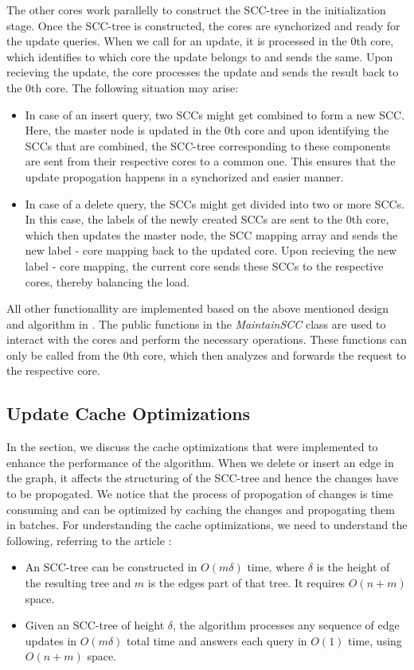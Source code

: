 The other cores work parallelly to construct the SCC-tree in the initialization stage. Once the SCC-tree is constructed, the cores are synchorized and ready for the update queries.
When we call for an update, it is processed in the 0th core, which identifies to which core the update belongs to and sends the same. Upon recieving the update, the core processes the update and sends the result back to the 0th core.
The following situation may arise:
\begin{itemize}
    \item In case of an insert query, two SCCs might get combined to form a new SCC. Here, the master node is updated in the 0th core and upon identifying the 
SCCs that are combined, the SCC-tree corresponding to these components are sent from their respective cores to a common one. This
ensures that the update propogation happens in a synchorized and easier manner.
    \item In case of a delete query, the SCCs might get divided into two or more SCCs. In this case, the labels of the newly created SCCs are sent to the 0th core, which then updates the master node, the SCC mapping array and sends the new label - core mapping back to the updated core.
Upon recieving the new label - core mapping, the current core sends these SCCs to the respective cores, thereby balancing the load.
\end{itemize}

All other functionallity are implemented based on the above mentioned design and algorithm in \secref{\ref{Sec: Theoretical Methodology}}. The public functions in the \textit{MaintainSCC} class are used to interact with the cores and perform the necessary operations.
These functions can only be called from the 0th core, which then analyzes and forwards the request to the respective core.

\subsection{Update Cache Optimizations}\label{Subsec: Cache Optimizations}

In the section, we discuss the cache optimizations that were implemented to enhance the performance of the algorithm.
When we delete or insert an edge in the graph, it affects the structuring of the SCC-tree and hence the changes have to be propogated.
We notice that the process of propogation of changes is time consuming and can be optimized by caching the changes and propogating them in batches.
For understanding the cache optimizations, we need to understand the following, referring to the article \cite{scc_tree_reference}:
\begin{itemize}
    \item An SCC-tree can be constructed in $O(m\delta)$ time, where $\delta$ is the height of
the resulting tree and $m$ is the edges part of that tree. It requires $O(n + m)$ space.
    \item Given an SCC-tree of height $\delta$, the algorithm processes any sequence of
    edge updates in $O(m\delta)$ total time and answers each query in $O(1)$ time, using $O(n + m)$
    space.
\end{itemize}

